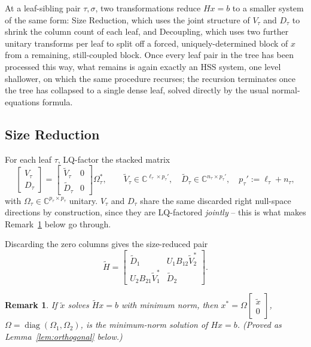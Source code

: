 \documentclass[11pt]{article}
\newtheorem{remark}{Remark}
\begin{document}
At a leaf-sibling pair $\tau,\sigma$, two transformations reduce $Hx=b$ to a
smaller system of the same form: Size Reduction, which uses the joint
structure of $V_\tau$ and $D_\tau$ to shrink the column count of each leaf, and
Decoupling, which uses two further unitary transforms per leaf to split off a
forced, uniquely-determined block of $x$ from a remaining, still-coupled
block. Once every leaf pair in the tree has been processed this way, what
remains is again exactly an HSS system, one level shallower, on which the same
procedure recurses; the recursion terminates once the tree has collapsed to a
single dense leaf, solved directly by the usual normal-equations formula.

\subsection{Size Reduction}
\label{subsec:sizereduction}

For each leaf $\tau$, LQ-factor the stacked matrix
\[
\begin{bmatrix}V_\tau\\ D_\tau\end{bmatrix}
=
\begin{bmatrix}\tilde V_\tau & 0\\ \tilde D_\tau & 0\end{bmatrix}\Omega_\tau^*,
\qquad
\tilde V_\tau\in\mathbb{C}^{\ell_\tau\times p_\tau'},\quad
\tilde D_\tau\in\mathbb{C}^{n_\tau\times p_\tau'},\quad
p_\tau' := \ell_\tau+n_\tau,
\]
with $\Omega_\tau\in\mathbb{C}^{p_\tau\times p_\tau}$ unitary. $V_\tau$ and $D_\tau$
share the same discarded right null-space directions by construction, since
they are LQ-factored \emph{jointly} -- this is what makes
Remark~\ref{rem:sizereduction} below go through.

Discarding the zero columns gives the size-reduced pair
\[
\tilde H =
\begin{bmatrix}
\tilde D_1 & U_1B_{12}\tilde V_2^*\\
U_2B_{21}\tilde V_1^* & \tilde D_2
\end{bmatrix}.
\]

\begin{remark}
\label{rem:sizereduction}
If $\tilde x$ solves $\tilde Hx=b$ with minimum norm, then
$x^*=\Omega\begin{bmatrix}\tilde x\\0\end{bmatrix}$, $\Omega=\operatorname{diag}(\Omega_1,\Omega_2)$,
is the minimum-norm solution of $Hx=b$. (Proved as Lemma~\ref{lem:orthogonal} below.)
\end{remark}
\end{document}
